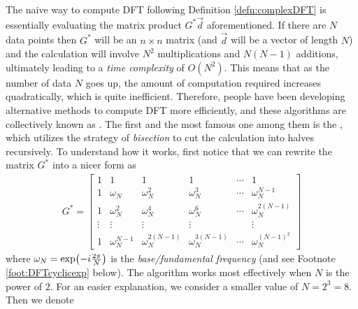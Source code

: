 The naive way to compute DFT following Definition \ref{defn:complexDFT} is essentially evaluating the matrix product $G^* \vec{d}$ aforementioned. If there are $N$ data points then $G^*$ will be an $n \times n$ matrix (and $\vec{d}$ will be a vector of length $N$) and the calculation will involve $N^2$ multiplications and $N(N-1)$ additions, ultimately leading to a \textit{time complexity} of $O(N^2)$. This means that as the number of data $N$ goes up, the amount of computation required increases quadratically, which is quite inefficient. Therefore, people have been developing alternative methods to compute DFT more efficiently, and these algorithms are collectively known as . The first and the most famous one among them is the , which utilizes the strategy of \textit{bisection} to cut the calculation into halves recursively. To understand how it works, first notice that we can rewrite the matrix $G^*$ into a nicer form as
\begin{align}
G^* = 
\begin{bmatrix}
1 & 1 & 1 & 1 & \cdots & 1 \\
1 & \omega_N & \omega_N^2 & \omega_N^3 & \cdots & \omega_N^{N-1} \\
1 & \omega_N^2 & \omega_N^4 & \omega_N^6 & \cdots & \omega_N^{2(N-1)} \\
\vdots & \vdots & \vdots & \vdots & & \vdots \\
1 & \omega_N^{N-1} & \omega_N^{2(N-1)} & \omega_N^{3(N-1)} & \cdots & \omega_N^{(N-1)^2}
\end{bmatrix}
\end{align}
where $\omega_N = \smash{\exp(-i\frac{2\pi}{N})}$ is the \textit{base/fundamental frequency} (and see Footnote \ref{foot:DFTcyclicexp} below). The algorithm works most effectively when $N$ is the power of $2$. For an easier explanation, we consider a smaller value of $N = 2^3 = 8$. Then we denote

